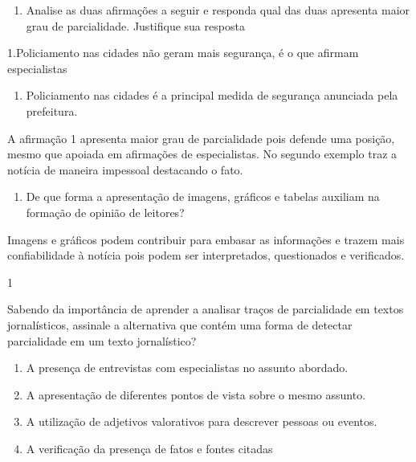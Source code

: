 {\begin{enumerate}
\def\labelenumi{\arabic{enumi})}
\setcounter{enumi}{8}
\tightlist
\item
  Analise as duas afirmações a seguir e responda qual das duas apresenta
  maior grau de parcialidade. Justifique sua resposta
\end{enumerate}

1.Policiamento nas cidades não geram mais segurança, é o que afirmam
especialistas

\begin{enumerate}
\def\labelenumi{\arabic{enumi}.}
\tightlist
\item
  Policiamento nas cidades é a principal medida de segurança anunciada
  pela prefeitura.
\end{enumerate}

A afirmação 1 apresenta maior grau de parcialidade pois defende uma
posição, mesmo que apoiada em afirmações de especialistas. No segundo
exemplo traz a notícia de maneira impessoal destacando o fato.

\begin{enumerate}
\def\labelenumi{\arabic{enumi})}
\setcounter{enumi}{9}
\tightlist
\item
  De que forma a apresentação de imagens, gráficos e tabelas auxiliam na
  formação de opinião de leitores?
\end{enumerate}

Imagens e gráficos podem contribuir para embasar as informações e trazem
mais confiabilidade à notícia pois podem ser interpretados, questionados
e verificados.


\num{1}

Sabendo da importância de aprender a analisar traços de parcialidade em
textos jornalísticos, assinale a alternativa que contém uma forma de
detectar parcialidade em um texto jornalístico?

\begin{enumerate}
\def\labelenumi{\alph{enumi})}
\item
  A presença de entrevistas com especialistas no assunto abordado.
\item
  A apresentação de diferentes pontos de vista sobre o mesmo assunto.
\item
  A utilização de adjetivos valorativos para descrever pessoas ou
  eventos.
\item
  A verificação da presença de fatos e fontes citadas
\end{enumerate}

}
